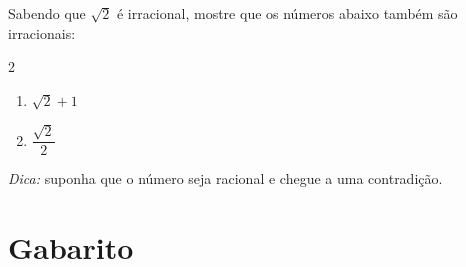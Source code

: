 \documentclass[11pt,a4paper]{article}
\begin{document}
\begin{desafio}
Sabendo que $\sqrt{2}$ é irracional, mostre que os números abaixo também são irracionais:
\begin{multicols}{2}
\begin{enumerate}[label=\alph*)]
  \item $\sqrt{2} + 1$
  \item $\dfrac{\sqrt{2}}{2}$
\end{enumerate}
\end{multicols}
\noindent\emph{Dica:} suponha que o número seja racional e chegue a uma contradição.
\end{desafio}

\newpage
\section*{Gabarito}
\end{document}
